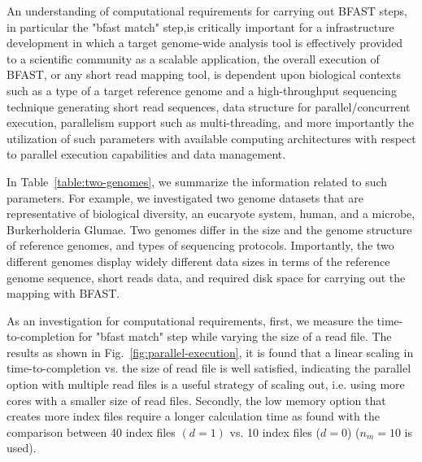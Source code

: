 \documentclass{acm_proc_article-sp}
\begin{document}
An understanding of computational requirements for carrying out BFAST steps, in particular the "bfast match" step,is 
critically important for a infrastructure development in which a target genome-wide analysis tool is effectively provided 
to a scientific community as a scalable application, the overall execution of BFAST, or any short read mapping tool, 
is dependent upon biological contexts such as a type of a target reference genome and a high-throughput sequencing 
technique generating short read sequences, data structure for parallel/concurrent execution, parallelism support such
 as multi-threading, and more importantly the utilization of such parameters with available computing architectures with 
 respect to parallel execution capabilities and data management.  

In Table~\ref{table:two-genomes}, we summarize the information related to such parameters. 
For example, we investigated two genome datasets that are representative of biological diversity, 
an eucaryote system, human, and a microbe, Burkerholderia Glumae\cite{kim2011}.  Two genomes 
differ in the size and the genome structure of reference genomes, and types of sequencing protocols.  
Importantly, the two different genomes display widely different data sizes in terms of the reference
genome sequence, short reads data, and required disk space for carrying out the mapping with BFAST. 

As an investigation for computational requirements, first, we measure the time-to-completion for "bfast match"
 step while varying the size of a read file.  The results as shown in Fig.~\ref{fig:parallel-execution}, it is found
  that a linear scaling in time-to-completion vs. the size of read file is well satisfied, indicating the parallel option 
  with multiple read files is a useful strategy of scaling out, i.e.  using more cores with a smaller size of read files.  
  Secondly, the low memory option that creates more index files require a longer calculation time as found 
  with the comparison between 40 index files $(d = 1)$ vs. 10 index files ($ d = 0 $) ($n_m = 10$ is used).   


\end{document}
